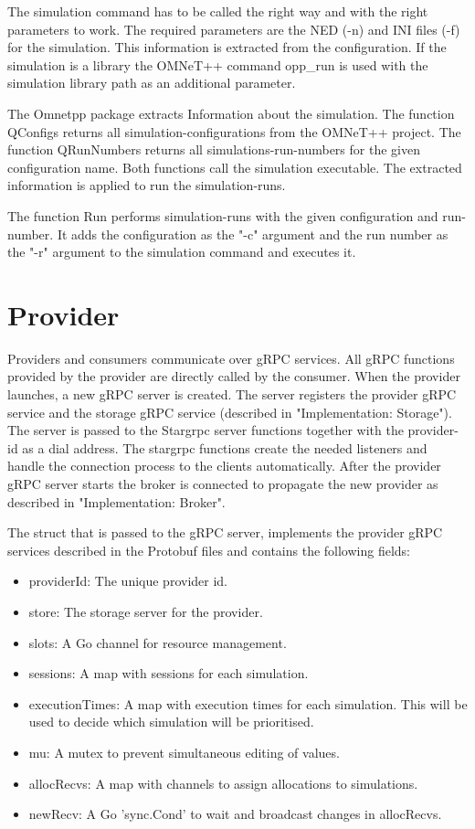 The simulation command has to be called the right way and with the right parameters to work. The required parameters are the NED (-n) and INI files (-f) for the simulation. This information is extracted from the configuration. If the simulation is a library the OMNeT++ command opp\_run is used with the simulation library path as an additional parameter.

The Omnetpp package extracts Information about the simulation. The function QConfigs returns all simulation-configurations from the OMNeT++ project. The function QRunNumbers returns all simulations-run-numbers for the given configuration name. Both functions call the simulation executable. The extracted information is applied to run the simulation-runs.

The function Run performs simulation-runs with the given configuration and run-number. It adds the configuration as the "-c" argument and the run number as the "-r" argument to the simulation command and executes it.

\section{Provider}
Providers and consumers communicate over gRPC services. All gRPC functions provided by the provider are directly called by the consumer. When the provider launches, a new gRPC server is created. The server registers the provider gRPC service and the storage gRPC service (described in "Implementation: Storage"). The server is passed to the Stargrpc server functions together with the provider-id as a dial address. The stargrpc functions create the needed listeners and handle the connection process to the clients automatically. After the provider gRPC server starts the broker is connected to propagate the new provider as described in "Implementation: Broker". 

The struct that is passed to the gRPC server, implements the provider gRPC services described in the Protobuf files and contains the following fields:
\begin{itemize}
    \item providerId: The unique provider id.
    \item store: The storage server for the provider.
    \item slots: A Go channel for resource management.
    \item sessions: A map with sessions for each simulation.
    \item executionTimes: A map with execution times for each simulation. This will be used to decide which simulation will be prioritised.
    \item mu: A mutex to prevent simultaneous editing of values.
    \item allocRecvs: A map with channels to assign allocations to simulations.
    \item newRecv: A Go 'sync.Cond' to wait and broadcast changes in allocRecvs.
\end{itemize}

